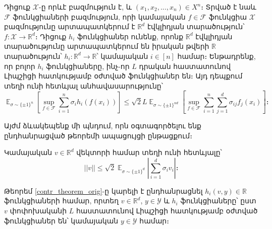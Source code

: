 \documentclass[12pt]{article}
\DeclareMathOperator*{\E}{\mathbb{E}}
\begin{document}
\begin{theorem}
\label{contr_theorem_orig}
Դիցուք $\mathcal{X}$-ը որևէ բազմություն է, և $(x_1, x_2, ..., x_n) \in X^n$։ Տրված է նաև $\mathcal{F}$ ֆունկցիաների բազմություն, որի կամայական $f \in \mathcal{F}$ ֆունկցիա $\mathcal{X}$ բազմությունը արտապատկերում է $\mathbb{R}^d$ էվկլիդյան տարածություն՝ $f:\mathcal{X} \rightarrow \mathbb{R}^d$։ Դիցուք $h_i$ ֆունկցիաներ ունենք, որոնք $\mathbb{R}^d$ էվկլիդյան տարածությունը արտապատկերում են  իրական թվերի $\mathbb{R}$ տարածություն՝
$h_i:\mathbb{R}^d \rightarrow \mathbb{R}$՝ կամայական $i \in [n]$ համար։ Ենթադրենք, որ բոլոր $h_i$ ֆունկցիաները, ինչ-որ $L$ դրական հաստատունով Լիպշիցի հատկությամբ օժտված ֆունկցիաներ են։ Այդ դեպքում տեղի ունի հետևյալ անհավասարությունը՝
\begin{equation}
\label{contradiction_ineq_1}
\E_{\sigma \sim \{\pm 1\}^n}\left[\sup_{f \in \mathcal{F}}  \sum_{i=1}^n{\sigma_ih_i(f(x_i))}  \right]    \leq \sqrt{2}L \E_{\sigma \sim \{\pm1\}^{nd}} \left[  \sup_{f \in \mathcal{F}}  \sum_{i=1}^n\sum_{j=1}^d{\sigma_{ij}f_j(x_i)}   \right]։
\end{equation}
\end{theorem}





Այժմ  ձևակեպենք մի պնդում, որն օգտագործելու ենք ընդհանրացված թեորեմի ապացույցի ընթացքում։  
\begin{preposition}
\label{prep_vec_ineq}
Կամայական $v \in \mathbb{R}^d$ վեկտորի համար տեղի ունի հետևյալը՝
$$||v|| \leq \sqrt{2}\E_{\sigma \sim \{\pm1\}^d} \left| \sum_{i=1}^d \sigma_iv_i \right|։$$
\end{preposition}


Թեորեմ \ref{contr_theorem_orig}-ը կարելի է ընդհանրացնել  $h_i(v, y) \in \mathbb{R}$ ֆունկցիաների համար, որտեղ $v \in \mathbb{R}^d$, $y \in \mathcal{Y}$ և $h_i$ ֆունկցիաները՝ ըստ $v$ փոփոխականի $L$ հաստատունով Լիպշիցի հատկությամբ օժտված ֆունկցիաներ են՝ կամայական $y \in \mathcal{Y}$ համար։ 
\end{document}
